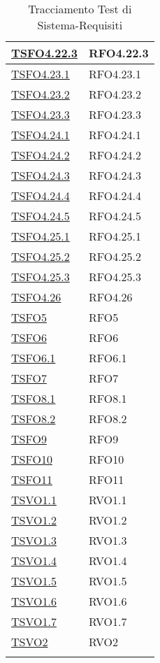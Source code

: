 \begin{longtable}{|>{\centering}m{5cm}|m{5cm}<{\centering}|}
\hyperlink{TSFO4.22.3}{TSFO4.22.3} & RFO4.22.3\\ \hline
\hyperlink{TSFO4.23.1}{TSFO4.23.1} & RFO4.23.1\\ \hline
\hyperlink{TSFO4.23.2}{TSFO4.23.2} & RFO4.23.2\\ \hline
\hyperlink{TSFO4.23.3}{TSFO4.23.3} & RFO4.23.3\\ \hline
\hyperlink{TSFO4.24.1}{TSFO4.24.1} & RFO4.24.1\\ \hline
\hyperlink{TSFO4.24.2}{TSFO4.24.2} & RFO4.24.2\\ \hline
\hyperlink{TSFO4.24.3}{TSFO4.24.3} & RFO4.24.3\\ \hline
\hyperlink{TSFO4.24.4}{TSFO4.24.4} & RFO4.24.4\\ \hline
\hyperlink{TSFO4.24.5}{TSFO4.24.5} & RFO4.24.5\\ \hline
\hyperlink{TSFO4.25.1}{TSFO4.25.1} & RFO4.25.1\\ \hline
\hyperlink{TSFO4.25.2}{TSFO4.25.2} & RFO4.25.2\\ \hline
\hyperlink{TSFO4.25.3}{TSFO4.25.3} & RFO4.25.3\\ \hline
\hyperlink{TSFO4.26}{TSFO4.26} & RFO4.26\\ \hline
\hyperlink{TSFO5}{TSFO5} & RFO5\\ \hline
\hyperlink{TSFO6}{TSFO6} & RFO6\\ \hline
\hyperlink{TSFO6.1}{TSFO6.1} & RFO6.1\\ \hline
\hyperlink{TSFO7}{TSFO7} & RFO7\\ \hline
\hyperlink{TSFO8.1}{TSFO8.1} & RFO8.1\\ \hline
\hyperlink{TSFO8.2}{TSFO8.2} & RFO8.2\\ \hline
\hyperlink{TSFO9}{TSFO9} & RFO9\\ \hline
\hyperlink{TSFO10}{TSFO10} & RFO10\\ \hline
\hyperlink{TSFO11}{TSFO11} & RFO11\\ \hline
\hyperlink{TSVO1.1}{TSVO1.1} & RVO1.1\\ \hline
\hyperlink{TSVO1.2}{TSVO1.2} & RVO1.2\\ \hline
\hyperlink{TSVO1.3}{TSVO1.3} & RVO1.3\\ \hline
\hyperlink{TSVO1.4}{TSVO1.4} & RVO1.4\\ \hline
\hyperlink{TSVO1.5}{TSVO1.5} & RVO1.5\\ \hline
\hyperlink{TSVO1.6}{TSVO1.6} & RVO1.6\\ \hline
\hyperlink{TSVO1.7}{TSVO1.7} & RVO1.7\\ \hline
\hyperlink{TSVO2}{TSVO2} & RVO2\\ \hline
\caption[Tracciamento Test di Sistema-Requisiti]{Tracciamento Test di Sistema-Requisiti}
\label{tabella:ts-requi}
\end{longtable}
\clearpage

